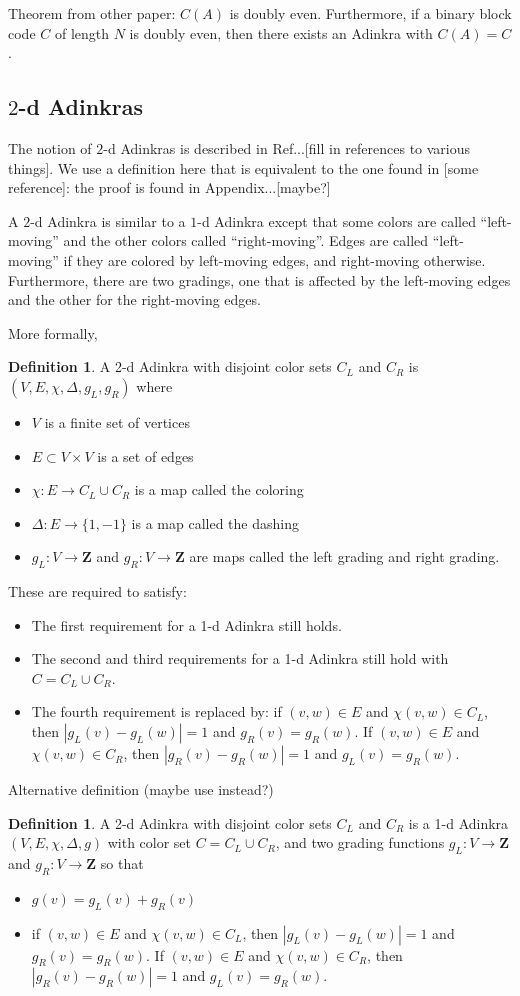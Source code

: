 \documentclass[12pt,twoside,singlespace]{article}
\numberwithin{equation}{section}
\theoremstyle{definition}
\newtheorem{definition}[equation]{Definition}
\newcommand{\ZZ}{\mathbf{Z}}
\begin{document}
Theorem from other paper:
$C(A)$ is doubly even.  Furthermore, if a binary block code $C$ of length $N$ is doubly even, then there exists an Adinkra with $C(A)=C$.


\subsection{$2$-d Adinkras}
The notion of $2$-d Adinkras is described in Ref...[fill in references to various things].  We use a definition here that is equivalent to the one found in [some reference]: the proof is found in Appendix...[maybe?]

A $2$-d Adinkra is similar to a $1$-d Adinkra except that some colors are called ``left-moving'' and the other colors called ``right-moving''.  Edges are called ``left-moving'' if they are colored by left-moving edges, and right-moving otherwise.  Furthermore, there are two gradings, one that is affected by the left-moving edges and the other for the right-moving edges.

More formally,
\begin{definition}
A 2-d Adinkra with disjoint color sets $C_L$ and $C_R$ is $(V,E,\chi,\Delta,g_L,g_R)$ where
\begin{itemize}
\item $V$ is a finite set of vertices
\item $E\subset V\times V$ is a set of edges
\item $\chi:E\to C_L\cup C_R$ is a map called the coloring
\item $\Delta:E\to \{1,-1\}$ is a map called the dashing
\item $g_L:V\to\ZZ$ and $g_R:V\to\ZZ$ are maps called the left grading and right grading.
\end{itemize}

These are required to satisfy:
\begin{itemize}
\item The first requirement for a 1-d Adinkra still holds.
\item The second and third requirements for a 1-d Adinkra still hold with $C=C_L\cup C_R$.
\item The fourth requirement is replaced by: if $(v,w)\in E$ and $\chi(v,w)\in C_L$, then $|g_L(v)-g_L(w)|=1$ and $g_R(v)=g_R(w)$.  If $(v,w)\in E$ and $\chi(v,w)\in C_R$, then $|g_R(v)-g_R(w)|=1$ and $g_L(v)=g_R(w)$.
\end{itemize}
\end{definition}

Alternative definition (maybe use instead?)
\begin{definition}
A 2-d Adinkra with disjoint color sets $C_L$ and $C_R$ is a 1-d Adinkra $(V,E,\chi,\Delta,g)$ with color set $C=C_L\cup C_R$, and two grading functions $g_L:V\to \ZZ$ and $g_R:V\to \ZZ$ so that
\begin{itemize}
\item $g(v)=g_L(v)+g_R(v)$
\item if $(v,w)\in E$ and $\chi(v,w)\in C_L$, then $|g_L(v)-g_L(w)|=1$ and $g_R(v)=g_R(w)$.  If $(v,w)\in E$ and $\chi(v,w)\in C_R$, then $|g_R(v)-g_R(w)|=1$ and $g_L(v)=g_R(w)$.
\end{itemize}
\end{definition}
\end{document}
